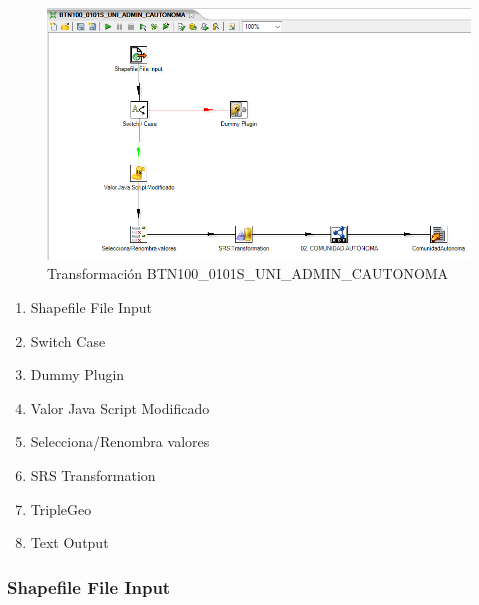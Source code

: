 \begin{figure}[H]
    \includegraphics[width=\textwidth]{images/CCAA.png}
    \centering
    \caption{Transformación BTN100\_0101S\_UNI\_ADMIN\_CAUTONOMA}
    \label{fig:CCAA}
\end{figure}


\begin{enumerate}
    \item Shapefile File Input
    \item Switch Case
    \item Dummy Plugin
    \item Valor Java Script Modificado
    \item Selecciona/Renombra valores
    \item SRS Transformation
    \item TripleGeo
    \item Text Output
\end{enumerate}


\subsubsection{Shapefile File Input}

